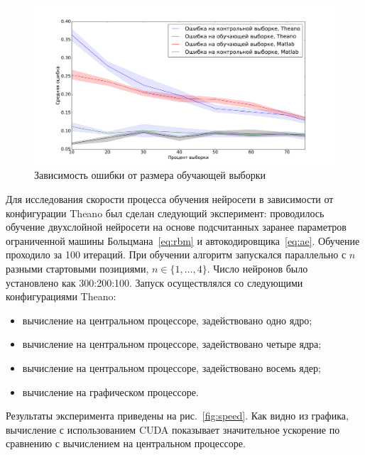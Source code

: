 \documentclass[12pt,notitlepage]{article}
\begin{document}
\begin{figure}[tb!]
 \centering
  \includegraphics[width=1.0\textwidth]{samples.pdf}
 \caption{Зависимость ошибки от размера обучающей выборки}
 \label{fig:samples}
\end{figure}


Для исследования скорости процесса обучения нейросети в зависимости от конфигурации Theano был сделан следующий эксперимент:
проводилось обучение двухслойной нейросети на основе подсчитанных заранее параметров ограниченной машины Больцмана~\eqref{eq:rbm} и автокодировщика~\eqref{eq:ae}. Обучение проходило за 100 итераций. При обучении алгоритм запускался параллельно с $n$ разными стартовыми позициями, $n \in \{1,\dots,4\}.$ Число нейронов было установлено как 300:200:100.
Запуск осуществлялся со следующими конфигурациями Theano:
\begin{itemize}
\item вычисление на центральном процессоре, задействовано 
одно ядро;
\item вычисление на центральном процессоре, задействовано четыре ядра;
\item вычисление на центральном процессоре, задействовано восемь ядер;
\item вычисление на графическом процессоре.
\end{itemize}

Результаты эксперимента приведены на рис.~\ref{fig:speed}. Как видно из графика, вычисление с использованием CUDA показывает значительное ускорение по сравнению с вычислением на центральном процессоре.
\end{document}
